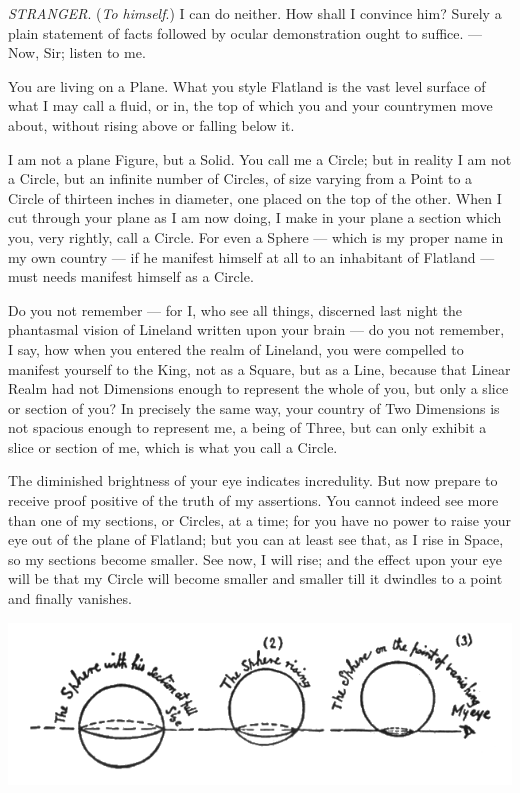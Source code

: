 \documentclass[10pt, kindle, oneside]{kindle}
\begin{document}
\emph{STRANGER}. (\emph{To himself}.) I can do neither. How shall I convince him? Surely a
plain statement of facts followed by ocular demonstration ought to suffice. ---
Now, Sir; listen to me.

You are living on a Plane. What you style Flatland is the vast level surface
of what I may call a fluid, or in, the top of which you and your countrymen
move about, without rising above or falling below it.

I am not a plane Figure, but a Solid. You call me a Circle; but in reality I
am not a Circle, but an infinite number of Circles, of size varying from a
Point to a Circle of thirteen inches in diameter, one placed on the top of the
other. When I cut through your plane as I am now doing, I make in your plane a
section which you, very rightly, call a Circle. For even a Sphere --- which is
my proper name in my own country --- if he manifest himself at all to an
inhabitant of Flatland --- must needs manifest himself as a Circle.

Do you not remember --- for I, who see all things, discerned last night the
phantasmal vision of Lineland written upon your brain --- do you not remember, I
say, how when you entered the realm of Lineland, you were compelled to
manifest yourself to the King, not as a Square, but as a Line, because that
Linear Realm had not Dimensions enough to represent the whole of you, but only
a slice or section of you? In precisely the same way, your country of Two
Dimensions is not spacious enough to represent me, a being of Three, but can
only exhibit a slice or section of me, which is what you call a Circle.

The diminished brightness of your eye indicates incredulity. But now prepare
to receive proof positive of the truth of my assertions. You cannot indeed see
more than one of my sections, or Circles, at a time; for you have no power to
raise your eye out of the plane of Flatland; but you can at least see that, as
I rise in Space, so my sections become smaller. See now, I will rise; and the
effect upon your eye will be that my Circle will become smaller and smaller
till it dwindles to a point and finally vanishes.

\includegraphics[trim=25mm 0mm 0mm 0mm,width=\linewidth]{fig8}
\end{document}

